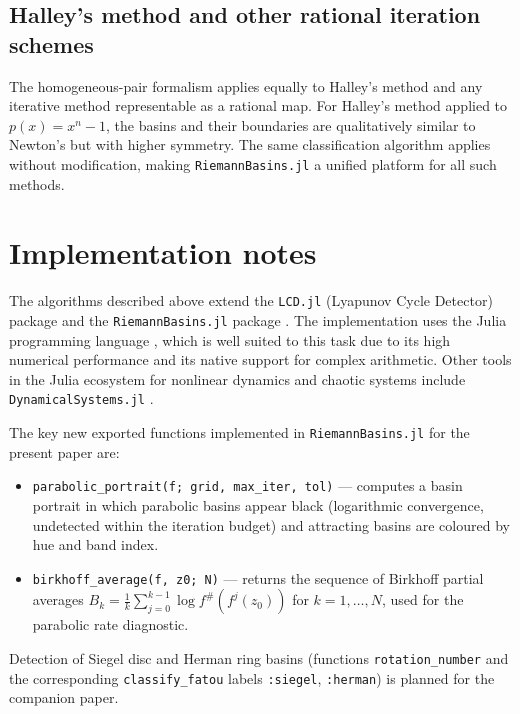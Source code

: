 \documentclass[12pt]{article}
\theoremstyle{definition}
\newcommand{\fsh}{f^{\#}}            %
\begin{document}
\subsection{Halley's method and other rational iteration schemes}

The homogeneous-pair formalism applies equally to Halley's method \cite{Halley1694} and
any iterative method representable as a rational map.  For Halley's
method applied to $p(x) = x^n - 1$, the basins and their boundaries
are qualitatively similar to Newton's but with higher symmetry.  The
same classification algorithm applies without modification, making
\texttt{RiemannBasins.jl} a unified platform for all such methods.

\section{Implementation notes}
\label{sec:implementation}

The algorithms described above extend the \texttt{LCD.jl}
(Lyapunov Cycle Detector) package \cite{LCD2022} and the
\texttt{RiemannBasins.jl} package \cite{RiemannBasins}.  The
implementation uses the Julia programming language \cite{Julia2017},
which is well suited to this task due to its high numerical performance
and its native support for complex arithmetic.
Other tools in the Julia ecosystem for nonlinear dynamics and chaotic systems
include \texttt{DynamicalSystems.jl} \cite{Datseris2022}.

The key new exported functions implemented in \texttt{RiemannBasins.jl}
for the present paper are:
\begin{itemize}
  \item \texttt{parabolic\_portrait(f; grid, max\_iter, tol)} --- computes
        a basin portrait in which parabolic basins appear black (logarithmic
        convergence, undetected within the iteration budget) and attracting
        basins are coloured by hue and band index.
  \item \texttt{birkhoff\_average(f, z0; N)} --- returns the sequence of
        Birkhoff partial averages $B_k = \frac{1}{k}\sum_{j=0}^{k-1}
        \log\fsh(f^j(z_0))$ for $k=1,\ldots,N$, used for the parabolic
        rate diagnostic.
\end{itemize}
Detection of Siegel disc and Herman ring basins (functions
\texttt{rotation\_number} and the corresponding \texttt{classify\_fatou}
labels \texttt{:siegel}, \texttt{:herman}) is planned for the companion
paper.
\end{document}
